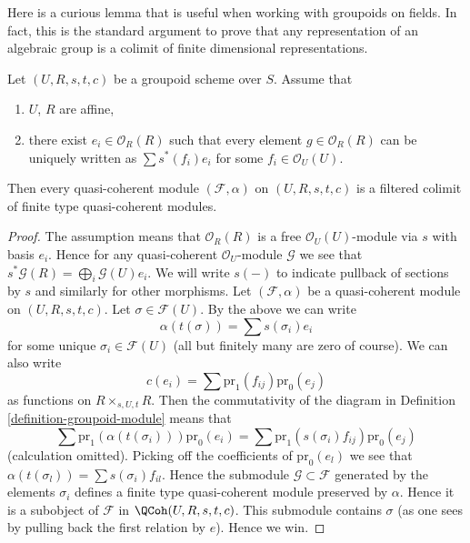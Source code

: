 \noindent
Here is a curious lemma that is useful when working with groupoids
on fields. In fact, this is the standard argument to prove that any
representation of an algebraic group is a colimit of finite dimensional
representations.

\begin{lemma}
\label{lemma-colimit-finite-type}
Let $(U, R, s, t, c)$ be a groupoid scheme over $S$.
Assume that
\begin{enumerate}
\item $U$, $R$ are affine,
\item there exist $e_i \in \mathcal{O}_R(R)$ such that
every element $g \in \mathcal{O}_R(R)$ can be uniquely written as
$\sum s^*(f_i)e_i$ for some $f_i \in \mathcal{O}_U(U)$.
\end{enumerate}
Then every quasi-coherent module $(\mathcal{F}, \alpha)$ on $(U, R, s, t, c)$
is a filtered colimit of finite type quasi-coherent modules.
\end{lemma}

\begin{proof}
The assumption means that $\mathcal{O}_R(R)$ is a free
$\mathcal{O}_U(U)$-module via $s$ with basis $e_i$. Hence
for any quasi-coherent $\mathcal{O}_U$-module $\mathcal{G}$
we see that $s^*\mathcal{G}(R) = \bigoplus_i \mathcal{G}(U)e_i$.
We will write $s(-)$ to indicate pullback of sections by $s$ and
similarly for other morphisms.
Let $(\mathcal{F}, \alpha)$ be a quasi-coherent module on
$(U, R, s, t, c)$. Let $\sigma \in \mathcal{F}(U)$. By the above
we can write
$$
\alpha(t(\sigma)) = \sum s(\sigma_i) e_i
$$
for some unique $\sigma_i \in \mathcal{F}(U)$ (all but finitely many
are zero of course). We can also write
$$
c(e_i) = \sum \text{pr}_1(f_{ij}) \text{pr}_0(e_j)
$$
as functions on $R \times_{s, U, t}R$. Then the commutativity of the diagram
in Definition \ref{definition-groupoid-module} means that
$$
\sum \text{pr}_1(\alpha(t(\sigma_i))) \text{pr}_0(e_i)
=
\sum \text{pr}_1(s(\sigma_i)f_{ij}) \text{pr}_0(e_j)
$$
(calculation omitted). Picking off the coefficients of $\text{pr}_0(e_l)$
we see that $\alpha(t(\sigma_l)) = \sum s(\sigma_i)f_{il}$. Hence
the submodule $\mathcal{G} \subset \mathcal{F}$ generated by the
elements $\sigma_i$ defines a finite type quasi-coherent module
preserved by $\alpha$. Hence it is a subobject of $\mathcal{F}$ in
$\QCoh(U, R, s, t, c)$. This submodule contains $\sigma$
(as one sees by pulling back the first relation by $e$). Hence we win.
\end{proof}


